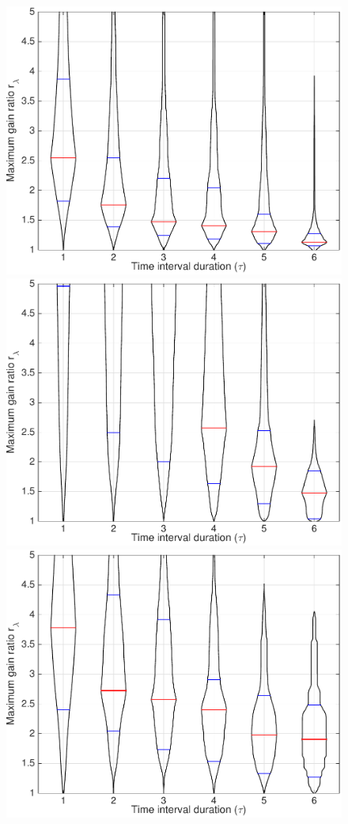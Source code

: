 \begin{figure}
\centering
\includegraphics[width=\mylength]{dist/20141021-maxGain-local-relativePerf}
\includegraphics[width=\mylength]{dist/20141022-maxGain-local-relativePerf}
\includegraphics[width=\mylength]{dist/20141030-maxGain-local-relativePerf} \\

\end{figure}
